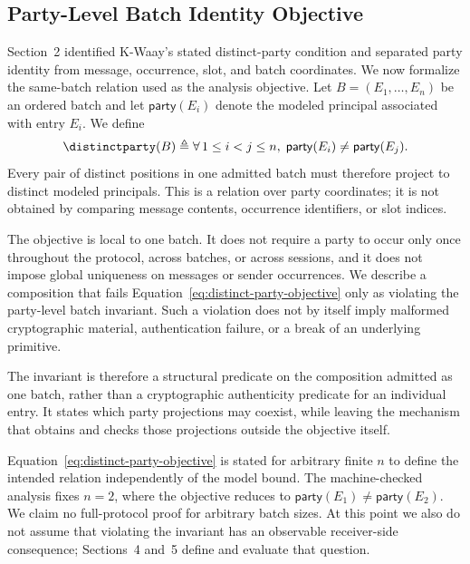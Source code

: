 
\subsection{Party-Level Batch Identity Objective}

Section~2 identified K-Waay's stated distinct-party condition and separated
party identity from message, occurrence, slot, and batch coordinates. We now
formalize the same-batch relation used as the analysis objective. Let
\(B=(E_1,\ldots,E_n)\) be an ordered batch and let
\(\mathsf{party}(E_i)\) denote the modeled principal associated with entry
\(E_i\). We define
\begin{equation}
  \distinctparty(B)
  \mathrel{\triangleq}
  \forall\,1 \leq i < j \leq n,\;
  \mathsf{party}(E_i)\neq\mathsf{party}(E_j).
  \label{eq:distinct-party-objective}
\end{equation}
Every pair of distinct positions in one admitted batch must therefore project
to distinct modeled principals. This is a relation over party coordinates; it
is not obtained by comparing message contents, occurrence identifiers, or slot
indices.

The objective is local to one batch. It does not require a party to occur only
once throughout the protocol, across batches, or across sessions, and it does
not impose global uniqueness on messages or sender occurrences. We describe a
composition that fails Equation~\eqref{eq:distinct-party-objective} only as
violating the party-level batch invariant. Such a violation does not by itself
imply malformed cryptographic material, authentication failure, or a break of
an underlying primitive.

The invariant is therefore a structural predicate on the composition admitted
as one batch, rather than a cryptographic authenticity predicate for an
individual entry. It states which party projections may coexist, while leaving
the mechanism that obtains and checks those projections outside the objective
itself.

Equation~\eqref{eq:distinct-party-objective} is stated for arbitrary finite
\(n\) to define the intended relation independently of the model bound. The
machine-checked analysis fixes \(n=2\), where the objective reduces to
\(\mathsf{party}(E_1)\neq\mathsf{party}(E_2)\). We claim no full-protocol proof
for arbitrary batch sizes. At this point we also do not assume that violating
the invariant has an observable receiver-side consequence; Sections~4 and~5
define and evaluate that question.

